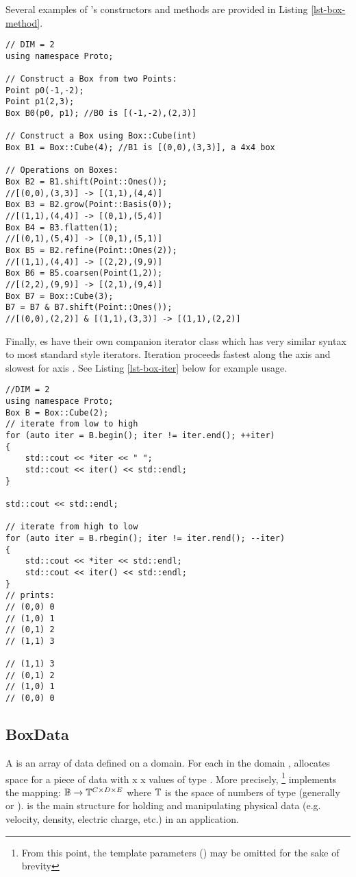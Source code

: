 \documentclass[12pt,a4paper]{article}
\begin{document}
Several examples of 's constructors and methods are provided in Listing \ref{lst-box-method}.

\begin{lstlisting}[caption = \code{Box} Methods, label=lst-box-method]
// DIM = 2
using namespace Proto;

// Construct a Box from two Points:
Point p0(-1,-2);
Point p1(2,3); 
Box B0(p0, p1); //B0 is [(-1,-2),(2,3)]

// Construct a Box using Box::Cube(int)
Box B1 = Box::Cube(4); //B1 is [(0,0),(3,3)], a 4x4 box

// Operations on Boxes:
Box B2 = B1.shift(Point::Ones());
//[(0,0),(3,3)] -> [(1,1),(4,4)]
Box B3 = B2.grow(Point::Basis(0));
//[(1,1),(4,4)] -> [(0,1),(5,4)]
Box B4 = B3.flatten(1);
//[(0,1),(5,4)] -> [(0,1),(5,1)]
Box B5 = B2.refine(Point::Ones(2));
//[(1,1),(4,4)] -> [(2,2),(9,9)]
Box B6 = B5.coarsen(Point(1,2));
//[(2,2),(9,9)] -> [(2,1),(9,4)]
Box B7 = Box::Cube(3);
B7 = B7 & B7.shift(Point::Ones());
//[(0,0),(2,2)] & [(1,1),(3,3)] -> [(1,1),(2,2)]
\end{lstlisting}

Finally, es have their own companion iterator class  which has very similar syntax to most standard  style iterators. Iteration proceeds fastest along the  axis and slowest for axis . See Listing \ref{lst-box-iter} below for example usage.

\begin{lstlisting}[caption=\code{BoxIterator} Usage,label=lst-box-iter]
//DIM = 2
using namespace Proto;
Box B = Box::Cube(2);
// iterate from low to high
for (auto iter = B.begin(); iter != iter.end(); ++iter)
{
	std::cout << *iter << " ";
	std::cout << iter() << std::endl; 
}

std::cout << std::endl;

// iterate from high to low
for (auto iter = B.rbegin(); iter != iter.rend(); --iter)
{
	std::cout << *iter << std::endl;
	std::cout << iter() << std::endl; 
}
// prints:
// (0,0) 0
// (1,0) 1
// (0,1) 2
// (1,1) 3

// (1,1) 3
// (0,1) 2
// (1,0) 1
// (0,0) 0

\end{lstlisting}

\subsection{BoxData}

A  is an array of data defined on a  domain. For each  in the domain ,  allocates space for a piece of data with  x  x  values of type . More precisely, \footnote{From this point, the template parameters () may be omitted for the sake of brevity} implements the mapping: $\mathbb{B}\rightarrow\mathbb{T}^{C\times D\times E}$ where $\mathbb{T}$ is the space of numbers of type  (generally  or ).  is the main structure for holding and manipulating physical data (e.g. velocity, density, electric charge, etc.) in an application. 
\end{document}
